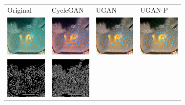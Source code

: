 \documentclass[conference]{IEEEtran}
\begin{document}
\begin{figure}
\centering
\begin{tabular}{p{1.7cm} p{1.7cm} p{1.7cm} p{1.5cm}}


   \small{Original} & \small{CycleGAN} & \small{UGAN} & \small{UGAN-P} \\

   \includegraphics[width=0.8in]{n01496331_15872_original} &
   \includegraphics[width=0.8in]{n01496331_15872_cimg}     &
   \includegraphics[width=0.8in]{n01496331_15872_u0img}    &
   \includegraphics[width=0.8in]{n01496331_15872_u1img}    \\ [-1ex]
   \includegraphics[width=0.8in]{n01496331_15872_oedges}   &
   \includegraphics[width=0.8in]{n01496331_15872_cedges}   &

\end{tabular}
\end{figure}
\end{document}
